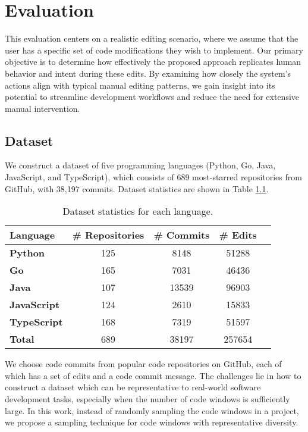 \chapter{Evaluation}

This evaluation centers on a realistic editing scenario, where we assume that the user has a specific set of code modifications they wish to implement. Our primary objective is to determine how effectively the proposed approach replicates human behavior and intent during these edits. By examining how closely the system’s actions align with typical manual editing patterns, we gain insight into its potential to streamline development workflows and reduce the need for extensive manual intervention.

\section{Dataset}

We construct a dataset of five programming languages (Python, Go, Java, JavaScript, and TypeScript), which consists of 689 most-starred repositories from GitHub,
with 38,197 commits. Dataset statistics are shown in Table \ref{tab:dataset-stats}.

\begin{table}[htbp]
\centering
\begin{tabular}{lcccc}
\hline
\textbf{Language} 
  & \textbf{\# Repositories} 
  & \textbf{\# Commits} 
  & \textbf{\# Edits} \\
\hline
\textbf{Python}      
  & 125   & 8148  
  & 51288 \\

\textbf{Go}          
  & 165   & 7031    
  & 46436 \\

\textbf{Java}        
  & 107   & 13539 
  & 96903 \\

\textbf{JavaScript}  
  & 124   & 2610      
  & 15833 \\

\textbf{TypeScript}  
  & 168  & 7319     
  & 51597\\
\hline
\textbf{Total}       
  & 689 & 38197
  & 257654 \\
\hline
\end{tabular}
\caption{Dataset statistics for each language.}
\label{tab:dataset-stats}
\end{table}

We choose code commits from popular code repositories on GitHub, each of which has a set of edits and a code commit message. The challenges lie in how to construct a dataset which can be representative to real-world software development tasks,  especially when the number of code windows is sufficiently large. In this work, instead of randomly sampling the code windows in a project, we propose a sampling technique for code windows with representative diversity.

